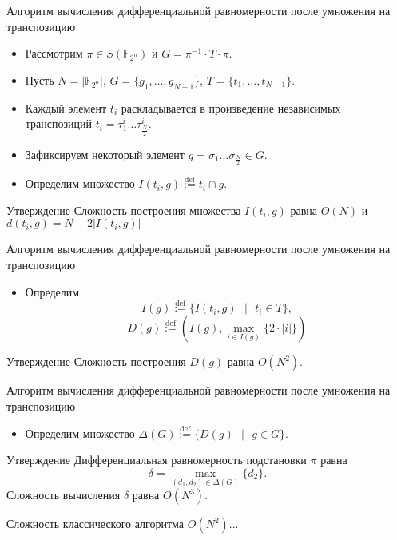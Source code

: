 \documentclass[11pt]{beamer}
\begin{document}
\begin{frame}{Алгоритм вычисления дифференциальной равномерности после умножения на транспозицию}
\begin{itemize}
    \item Рассмотрим $\pi \in S(\mathbb{F}_{2^n})$ и $G = \pi^{-1} \cdot T \cdot \pi$.
    \item Пусть $N = |\mathbb{F}_{2^{n}}|$, $G = \{g_{1}, \dots, g_{N - 1}\}$, $T = \{t_{1}, \dots, t_{N - 1}\}$.
    \item Каждый элемент $t_i$ раскладывается в произведение независимых транспозиций $t_i=\tau_1^i \dots \tau_{\frac{N}{2}}^i$.
    \item Зафиксируем некоторый элемент $g = \sigma_{1}\dots\sigma_{\frac{N}{2}} \in G$.
    \item Определим множество $I(t_{i}, g) \stackrel{\text{def}}{:=} t_{i} \cap g$.
\end{itemize}

\begin{block}{Утверждение}
 Сложность построения множества $I(t_i,g)$ равна $O(N)$ и  $d(t_{i}, g) = N - 2 |I(t_{i}, g)|$
\end{block}




\end{frame}

\begin{frame}{Алгоритм вычисления дифференциальной равномерности после умножения на транспозицию}
\begin{itemize}
    \item Определим
$$I(g) \stackrel{\text{def}}{:=} \{I(t_{i}, g) \text{ } | \text{ } t_{i} \in T \},$$
$$D(g) \stackrel{\text{def}}{:=} (I(g), \underset{i \in I(g)}{\max} {\{2 \cdot|i| \}})$$
\end{itemize}

\begin{block}{Утверждение}
 Сложность построения $D(g)$ равна $O(N^{2})$.
\end{block}
\end{frame}

\begin{frame}{Алгоритм вычисления дифференциальной равномерности после умножения на транспозицию}
\begin{itemize}
    \item Определим множество $\Delta(G) \stackrel{\text{def}}{:=} \{D(g) \text{ } | \text{ } g \in G\}$. 
\end{itemize}

\begin{block}{Утверждение}
 Дифференциальная равномерность подстановки $\pi$ равна $$\delta = \underset{(d_{1}, d_{2}) \in \Delta(G)}{\max} \{d_{2} \}.$$ Сложность вычисления $\delta$ равна $O(N^{3})$.
\end{block}


Сложность классического алгоритма $O(N^2)$...
\end{frame}
\end{document}
